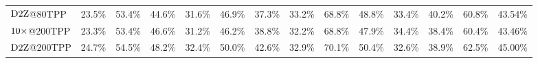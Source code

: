 \begin{table}
\begin{tabular}{@{}lccccccccccccc@{}}
$\mbox{D2Z}$@80TPP  & 23.5\%                                                         & 53.4\%                                                          & 44.6\%                                                         & 31.6\%                                                             & 46.9\%                                                                & 37.3\%                                                                & 33.2\%        & 68.8\%        & 48.8\%         & 33.4\%                                                           & 40.2\%                                                             & 60.8\%                                                          & \cellcolor{gray!30}43.54\%                                                                   \\
$\mbox{10}\times$@200TPP & 23.3\%                                                         & 53.4\%                                                          & 46.6\%                                                         & 31.2\%                                                             & 46.2\%                                                                & 38.8\%                                                                & 32.2\%        & 68.8\%        & 47.9\%         & 34.4\%                                                           & 38.4\%                                                             & 60.4\%                                                          & \cellcolor{gray!30}43.46\%                                                                   \\
$\mbox{D2Z}$@200TPP & 24.7\%                                                         & 54.5\%                                                          & 48.2\%                                                         & 32.4\%                                                             & 50.0\%                                                                & 42.6\%                                                                & 32.9\%        & 70.1\%        & 50.4\%         & 32.6\%                                                           & 38.9\%                                                             & 62.5\%                                                          & \cellcolor{gray!30}45.00\%                                                                   \\ \bottomrule
\end{tabular}
\end{table}
